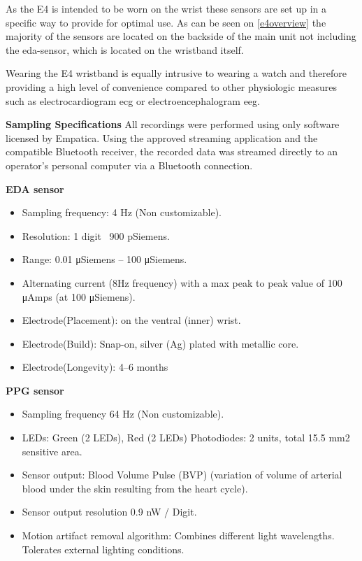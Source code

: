 As the E4 is intended to be worn on the wrist these sensors are set up in a specific way to provide for optimal use. As can be seen on \ref{e4overview} the majority of the sensors are located on the backside of the main unit not including the \gls{eda}-sensor, which is located on the wristband itself. 

Wearing the E4 wristband is equally intrusive to wearing a watch and therefore providing a high level of convenience compared to other physiologic measures such as electrocardiogram \gls{ecg} or electroencephalogram \gls{eeg}.

\textbf{Sampling Specifications}
All recordings were performed using only software licensed by Empatica. Using the approved streaming application and the compatible Bluetooth receiver, the recorded data was streamed directly to an operator's personal computer via a Bluetooth connection. 

\textbf{EDA sensor}
\begin{itemize}
\item Sampling frequency: 4 Hz (Non customizable).
\item Resolution: 1 digit ~900 pSiemens.
\item Range: 0.01 μSiemens – 100 μSiemens.
\item Alternating current (8Hz frequency) with a
max peak to peak value of 100 μAmps (at 100
μSiemens).
\item Electrode(Placement): on the ventral (inner) wrist.
\item Electrode(Build): Snap-on, silver (Ag) plated with metallic core.
\item Electrode(Longevity): 4–6 months
\end{itemize}

\textbf{PPG sensor}
\begin{itemize}
\item Sampling frequency 64 Hz (Non customizable).
\item LEDs: Green (2 LEDs), Red (2 LEDs) Photodiodes: 2
units, total 15.5 mm2 sensitive area.
\item Sensor output: Blood Volume Pulse (BVP) (variation
of volume of arterial blood under the skin resulting
from the heart cycle).
\item Sensor output resolution 0.9 nW / Digit.
\item Motion artifact removal algorithm: Combines different light wavelengths. Tolerates external lighting conditions.
\end{itemize}

